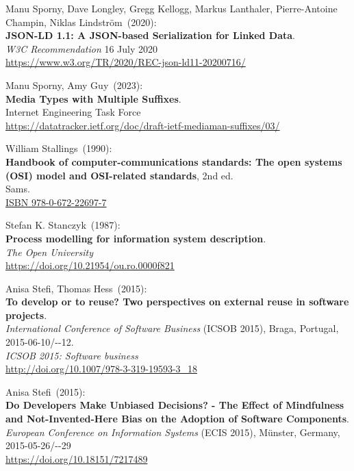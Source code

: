 \begin{thebibliography}{9}
Manu Sporny, Dave Longley, Gregg Kellogg, Markus Lanthaler, Pierre-Antoine Champin, Niklas Lindström~(2020): \\
\textbf{JSON-LD 1.1: A JSON-based Serialization for Linked Data}.\\
\emph{W3C Recommendation} 16 July 2020\\
\url{https://www.w3.org/TR/2020/REC-json-ld11-20200716/}

Manu Sporny, Amy Guy~(2023): \\
\textbf{{Media Types with Multiple Suffixes}}.\\
Internet Engineering Task Force\\
\url{https://datatracker.ietf.org/doc/draft-ietf-mediaman-suffixes/03/}
 
William Stallings~(1990): \\
\textbf{Handbook of computer-communications standards: {The} open systems ({OSI}) model and {OSI-related} standards}, 2nd ed. \\
Sams.\\
\href{https://identifiers.org/isbn/9780672226977}{ISBN 978-0-672-22697-7}
 
Stefan K. Stanczyk~(1987): \\
\textbf{Process modelling for information system description}.\\
\emph{The Open University} \\
\url{https://doi.org/10.21954/ou.ro.0000f821}

Anisa Stefi, Thomas Hess~(2015): \\
\textbf{To develop or to reuse? Two perspectives on external reuse in software projects}. \\
\emph{International Conference of Software Business} (ICSOB 2015), Braga, Portugal, 2015-06-10/-{}-12.\\
\emph{ICSOB 2015: Software business} \\
\url{http://doi.org/10.1007/978-3-319-19593-3_18}

Anisa Stefi~(2015): \\
\textbf{Do Developers Make Unbiased Decisions? - The Effect of Mindfulness and Not-Invented-Here Bias on the Adoption of Software Components}. \\
\emph{European Conference on Information Systems} (ECIS 2015), Münster, Germany, 2015-05-26/-{}-29 \\
\url{https://doi.org/10.18151/7217489}


\end{thebibliography}
